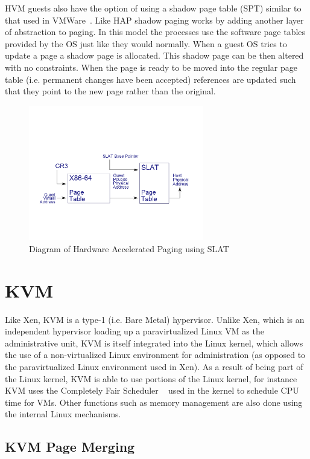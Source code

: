 HVM guests also have the option of using a shadow page table (SPT) similar to that used in VMWare~\cite{rosenblum_vmwareas_1999}.  Like HAP shadow paging works by adding another layer of abstraction to paging. In this model the processes use the software page tables provided by the OS just like they would normally. When a guest OS tries to update a page a shadow page is allocated. This shadow page can be then altered with no constraints. When the page is ready to be moved into the regular page table (i.e. permanent changes have been accepted) references are updated such that they point to the new page rather than the original.

\begin{figure}\label{SLAT}
	  \centering
	  \includegraphics[width=3in]{figures/BM_Graph1.png}
	  \caption{Diagram of Hardware Accelerated Paging using SLAT }
\end{figure}

\section{KVM}

Like Xen, KVM is a type-1 (i.e. Bare Metal) hypervisor. Unlike Xen, which is an independent hypervisor loading up a paravirtualized Linux VM as the administrative unit, KVM is itself integrated into the Linux kernel, which allows the use of a non-virtualized Linux environment for administration (as opposed to the paravirtualized Linux environment used in Xen). As a result of being part of the Linux kernel, KVM is able to use portions of the Linux kernel, for instance KVM uses the Completely Fair Scheduler ~\cite{pabla_completely_2009} used in the kernel to schedule CPU time for VMs. Other functions such as memory management are also done using the internal Linux mechanisms.  

\subsection{KVM Page Merging}

